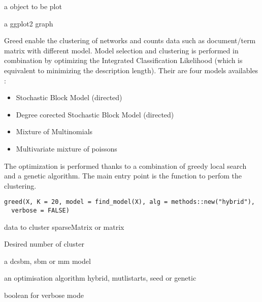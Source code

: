 \documentclass[letterpaper]{book}
\begin{document}
%
\begin{Arguments}
\begin{ldescription}
\item[\code{x}] a  object to be plot
\end{ldescription}
\end{Arguments}
%
\begin{Value}
a ggplot2 graph
\end{Value}
%
\begin{Description}\relax
Greed enable the clustering of networks and counts data such as document/term matrix with different model. 
Model selection and clustering is performed in combination by optimizing the Integrated Classification Likelihood 
(which is equivalent to minimizing the description length). 
Their are four models availables : 
\begin{itemize}

\item Stochastic Block Model (directed)
\item Degree corected Stochastic Block Model (directed)
\item Mixture of Multinomials
\item Multivariate mixture of poissons

\end{itemize}

The optimization is performed thanks to a combination of greedy local search and a genetic algorithm. 
The main entry point is the  function to perfom the clustering.
\end{Description}
%
\begin{Usage}
\begin{verbatim}
greed(X, K = 20, model = find_model(X), alg = methods::new("hybrid"),
  verbose = FALSE)
\end{verbatim}
\end{Usage}
%
\begin{Arguments}
\begin{ldescription}
\item[\code{X}] data to cluster sparseMatrix or matrix

\item[\code{K}] Desired number of cluster

\item[\code{model}] a dcsbm, sbm or mm model

\item[\code{alg}] an optimisation algorithm hybrid, mutlistarts, seed or genetic

\item[\code{verbose}] boolean for verbose mode
\end{ldescription}
\end{Arguments}
\end{document}
